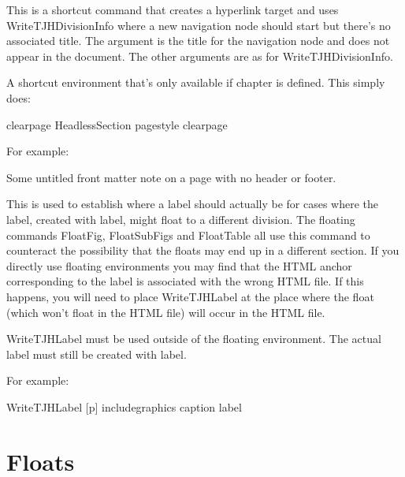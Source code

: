 \documentclass[toc=listof]{scrreport}
\begin{document}
This is a shortcut command that creates a hyperlink target and uses
\gls{WriteTJHDivisionInfo} where a new navigation node should start
but there's no associated title. The  argument is the
title for the navigation node and does not appear in the document.
The other arguments are as for \gls{WriteTJHDivisionInfo}.

A shortcut environment that's only available if \gls{chapter} is
defined. This simply does:
\begin{compactcodebox*}
\gls{clearpage}
\gls{HeadlessSection}
\gls{pagestyle}
\gls{clearpage}
\end{compactcodebox*}

For example:
\begin{codebox}
Some untitled front matter note on a page with no header or footer.
\end{codebox}

This is used to establish where a label should actually be for cases
where the label, created with \gls{label}, might float to a different division. The
floating commands \gls{FloatFig}, \gls{FloatSubFigs} and \gls{FloatTable}
all use this command to counteract the possibility that the floats
may end up in a different section. If you directly use floating
environments you may find that the HTML anchor corresponding to the
label is associated with the wrong HTML file. If this happens, you
will need to place \gls{WriteTJHLabel} at the place where the float
(which won't float in the HTML file) will occur in the HTML file.

\begin{important}
\gls{WriteTJHLabel} must be used outside of the floating
environment. The actual label must still be created with
\gls{label}.
\end{important}

For example:
\begin{codebox}
\gls{WriteTJHLabel}
[p]
\gls{includegraphics}
\gls{caption}
\gls{label}
\end{codebox}

\section{Floats}
\label{sec:floats}
\end{document}
